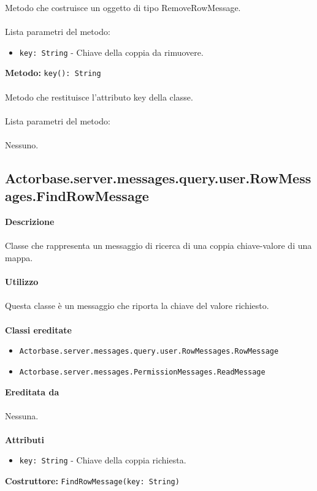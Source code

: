 \documentclass[a4paper]{article}
\begin{document}
		Metodo che costruisce un oggetto di tipo RemoveRowMessage.
			\\ \\
		Lista parametri del metodo:
			\begin{itemize}
				\item \texttt{key: String} - Chiave della coppia da rimuovere.
			\end{itemize}
		\textbf{Metodo: }\texttt{key(): String}
			\\ \\
		Metodo che restituisce l'attributo key della classe.
			\\ \\
		Lista parametri del metodo:
			\\ \\
			Nessuno.
			
	\subsection{Actorbase.server.messages.query.user.RowMessages.FindRowMessage}
		\textbf{Descrizione}
			\\ \\
		Classe che rappresenta un messaggio di ricerca di una coppia chiave-valore di una mappa.
			\\ \\
		\textbf{Utilizzo}
			\\ \\
		Questa classe è un messaggio che riporta la chiave del valore richiesto.
			\\ \\
		\textbf{Classi ereditate}
			\begin{itemize}
				\item \texttt{Actorbase.server.messages.query.user.RowMessages.RowMessage }
				\item \texttt{Actorbase.server.messages.PermissionMessages.ReadMessage }
			\end{itemize}
		\textbf{Ereditata da}
			\\ \\
			Nessuna.
			\\ \\
		\textbf{Attributi}
			\begin{itemize}
				\item \texttt{key: String} - Chiave della coppia richiesta.
			\end{itemize}
		\textbf{Costruttore: }\texttt{FindRowMessage(key: String)}
			\\ \\
\end{document}
